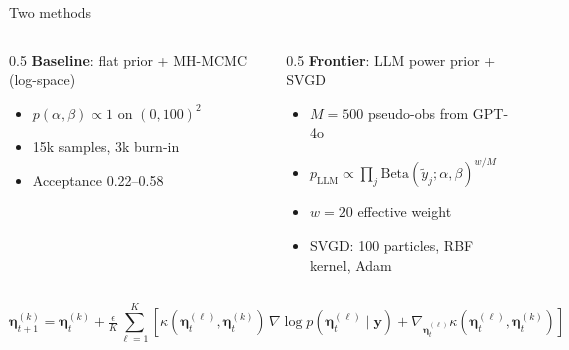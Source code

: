 \documentclass[10pt, aspectratio=169]{beamer}
\begin{document}
\begin{frame}{Two methods}
\begin{columns}[T]
\begin{column}{0.5\textwidth}
\textbf{Baseline}: flat prior + MH-MCMC (log-space)
\begin{itemize}\setlength{\itemsep}{2pt}
  \item $p(\alpha,\beta) \propto 1$ on $(0, 100)^2$
  \item 15k samples, 3k burn-in
  \item Acceptance 0.22--0.58 \checkmark
\end{itemize}
\end{column}
\begin{column}{0.5\textwidth}
\textbf{Frontier}: LLM power prior + SVGD
\begin{itemize}\setlength{\itemsep}{2pt}
  \item $M=500$ pseudo-obs from GPT-4o
  \item $p_{\text{LLM}} \propto \prod_j \mathrm{Beta}(\tilde y_j; \alpha, \beta)^{w/M}$
  \item $w = 20$ effective weight
  \item SVGD: 100 particles, RBF kernel, Adam
\end{itemize}
\end{column}
\end{columns}
\vspace{1em}
\small
\begin{equation*}
  \bm{\eta}^{(k)}_{t+1} = \bm{\eta}^{(k)}_t + \tfrac{\epsilon}{K}\sum_{\ell=1}^K
  \!\left[\kappa(\bm{\eta}^{(\ell)}_t, \bm{\eta}^{(k)}_t)\,\nabla\!\log p(\bm{\eta}^{(\ell)}_t \mid \mathbf{y})
  + \nabla_{\bm{\eta}^{(\ell)}_t}\kappa(\bm{\eta}^{(\ell)}_t, \bm{\eta}^{(k)}_t)\right]
\end{equation*}
\end{frame}
\end{document}
